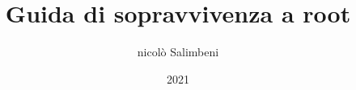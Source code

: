 \documentclass[a4paper,12pt]{book}
\begin{document}
\author{nicolò Salimbeni}
\title{Guida di sopravvivenza a root}
\date{2021}

\mainmatter %
\maketitle  %
\tableofcontents  %




\end{document}
